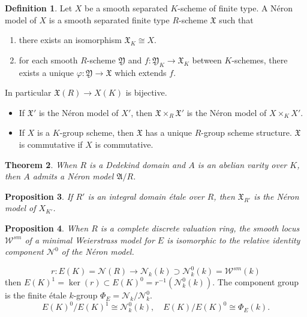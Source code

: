 \documentclass[leqno]{amsart}
\newcommand{\1}{\mathbf{1}}
\newtheorem{thm}{Theorem}[section]
\newtheorem{prop}[thm]{Proposition}
\theoremstyle{definition}
\newtheorem{defn}[thm]{Definition}
\theoremstyle{remark}
\begin{document}
\begin{defn}
	 Let $X$ be a smooth separated $K$-scheme of finite type.
	 A N\'{e}ron model of $X$ is a smooth separated finite type
	 $R$-scheme $\mathfrak{X}$ such that
	 \begin{enumerate}[label=(\alph*)]
		 \item there exists an isomorphism
			 $\mathfrak{X}_K\cong X$.
		 \item for each smooth $R$-scheme $\mathfrak{Y}$
		 and $f\colon\mathfrak{Y}_K\to \mathfrak{X}_K$
		 between  $K$-schemes, 
		 there exists a unique  
		 $\varphi\colon\mathfrak{Y}\to \mathfrak{X}$
		 which extends $f$.
	 \end{enumerate}
	 In particular $\mathfrak{X}(R)\to X(K)$
	 is bijective.
\end{defn}
\begin{itemize}
	\item If $\mathfrak{X}'$ is the N\'{e}ron model
		of $X'$, then
		$\mathfrak{X}\times_R\mathfrak{X}'$
		is the  N\'{e}ron model of $X\times_KX'$.
	\item If $X$ is a  $K$-group scheme,
		then  $\mathfrak{X}$ has a unique
		 $R$-group scheme structure.
		 $\mathfrak{X}$ is commutative if
		 $X$ is commutative.
\end{itemize}


\begin{thm}
	When $R$ is a Dedekind domain
	and  $A$ is an abelian varity over  $K$,
	then  $A$ admits a  N\'{e}ron model $\mathfrak{A}/R$.
\end{thm}

\begin{prop}
	If $R'$ is an integral domain \'{e}tale over $R$,
	then  $\mathfrak{X}_{R'}$ 
	is the N\'{e}ron model of $X_{K'}$.
\end{prop}

\begin{prop}
	When $R$ is a complete discrete valuation ring,
	the smooth locus  $\mathcal{W}^{sm}$ 
	of a minimal Weierstrass model for $E$
	is isomorphic to the relative identity component 
	$\mathcal{N}^0$ of the  N\'{e}ron model.
\end{prop}
\[
	r\colon E(K)=\mathcal{N}(R)\to
	\mathcal{N}_k(k)\supset \mathcal{N}^0_k(k)=
	\mathcal{W}^{sm}(k)
\]
then $E(K)^1=\ker(r)\subset E(K)^0=r^{-1}(\mathcal{N}^0_k(k))$.
The component group is the 
finite \'{e}tale $k$-group  $\Phi_E=\mathcal{N}_k/\mathcal{N}^0_k$.
\[
	E(K)^0/E(K)^1\cong \mathcal{N}^0_k(k),\quad
	E(K)/E(K)^0\cong \Phi_E(k).
\]
\end{document}
